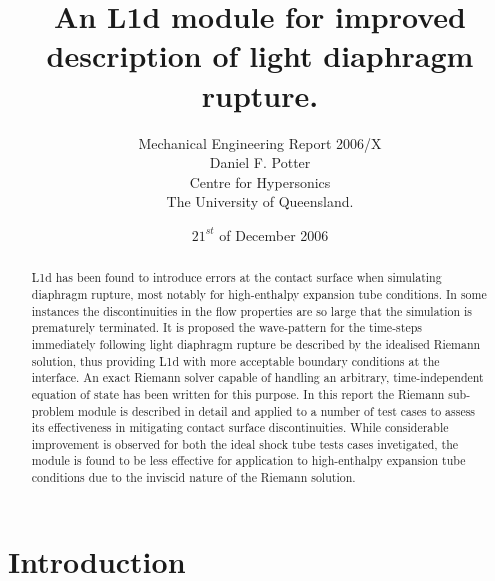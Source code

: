 \documentclass[a4paper,10pt]{article}
\title{
    An L1d module for improved description of light diaphragm rupture.
}
\author{
    Mechanical Engineering Report 2006/X\\
    Daniel F. Potter\\Centre for Hypersonics\\The University of Queensland.
}
\date{$21^{st}$ of December 2006}
\begin{document}
\maketitle

\begin{abstract}
L1d has been found to introduce errors at the contact surface when simulating diaphragm rupture, most notably for high-enthalpy expansion tube conditions.  In some instances the discontinuities in the flow properties are so large that the simulation is prematurely terminated.  It is proposed the wave-pattern for the time-steps immediately following light diaphragm rupture be described by the idealised Riemann solution, thus providing L1d with more acceptable boundary conditions at the interface.  An exact Riemann solver capable of handling an arbitrary, time-independent equation of state has been written for this purpose.  In this report the Riemann sub-problem module is described in detail and applied to a number of test cases to assess its effectiveness in mitigating contact surface discontinuities.  While considerable improvement is observed for both the ideal shock tube tests cases invetigated, the module is found to be less effective for application to high-enthalpy expansion tube conditions due to the inviscid nature of the Riemann solution.
\end{abstract}

\newpage

\tableofcontents

\newpage

\section{Introduction}
\end{document}

